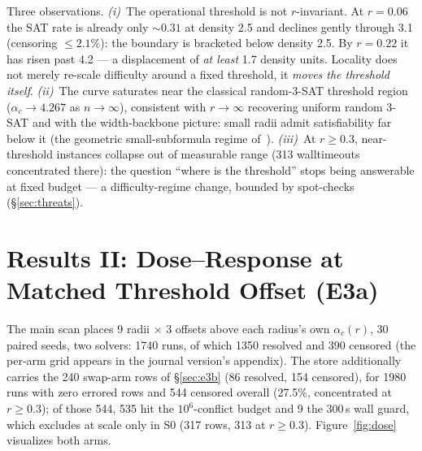 \documentclass[11pt]{article}
\newcommand{\ac}[1]{\ensuremath{\alpha_c(#1)}}
\begin{document}
Three observations. \emph{(i)}~The operational threshold is not
$r$-invariant. At $r=0.06$ the SAT rate is already only ${\sim}0.31$ at
density 2.5 and declines gently through 3.1 (censoring $\le2.1\%$): the
boundary is bracketed below density 2.5. By $r=0.22$ it has risen past 4.2
--- a displacement of \emph{at least} 1.7 density units. Locality does not
merely re-scale difficulty around a fixed threshold, it \emph{moves the
threshold itself}. \emph{(ii)}~The curve saturates near the classical
random-3-SAT threshold region~\cite{mezard2002} ($\alpha_c \to 4.267$ as $n\to\infty$),
consistent with $r\to\infty$ recovering uniform random 3-SAT and with the
width-backbone picture: small radii admit satisfiability far below it (the
geometric small-subformula regime of~\cite{blasius2022}). \emph{(iii)}~At $r\ge0.3$,
near-threshold instances collapse out of measurable range (313 walltimeouts
concentrated there): the question ``where is the threshold'' stops being
answerable at fixed budget --- a difficulty-regime change, bounded by
spot-checks (\S\ref{sec:threats}).

\section{Results II: Dose--Response at Matched Threshold Offset (E3a)}
\label{sec:e3a}

The main scan places 9 radii $\times$ 3 offsets above each radius's own
$\ac{r}$, 30 paired seeds, two solvers: 1740 runs, of which 1350 resolved
and 390 censored (the per-arm grid appears in the journal version's
appendix). The store additionally carries
the 240 swap-arm rows of \S\ref{sec:e3b} (86 resolved, 154 censored), for
1980 runs with zero errored rows and 544 censored overall (27.5\%,
concentrated at $r\ge0.3$); of those 544, 535 hit the $10^6$-conflict
budget and 9 the $300$\,s wall guard, which excludes at scale only in S0
(317 rows, 313 at $r\ge0.3$). Figure~\ref{fig:dose}
visualizes both arms.
\end{document}
